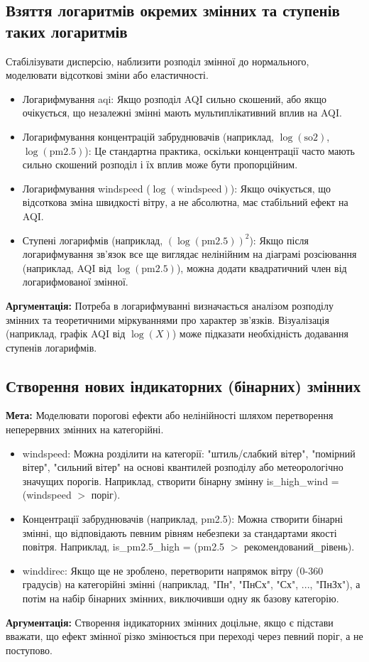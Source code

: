 \documentclass{article}
\begin{document}
\subsection{Взяття логаритмів окремих змінних та ступенів таких логаритмів}
Стабілізувати дисперсію, наблизити розподіл змінної до нормального, моделювати відсоткові зміни або еластичності.
\begin{itemize}
    \item Логарифмування aqi: Якщо розподіл AQI сильно скошений, або якщо очікується, що незалежні змінні мають мультиплікативний вплив на AQI.
    \item Логарифмування концентрацій забруднювачів (наприклад, $\log(\text{so2})$, $\log(\text{pm2.5})$): Це стандартна практика, оскільки концентрації часто мають сильно скошений розподіл і їх вплив може бути пропорційним.
    \item Логарифмування windspeed ($\log(\text{windspeed})$): Якщо очікується, що відсоткова зміна швидкості вітру, а не абсолютна, має стабільний ефект на AQI.
    \item Ступені логарифмів (наприклад, $(\log(\text{pm2.5}))^2$): Якщо після логарифмування зв'язок все ще виглядає нелінійним на діаграмі розсіювання (наприклад, AQI від $\log(\text{pm2.5})$), можна додати квадратичний член від логарифмованої змінної.
\end{itemize}
\textbf{Аргументація:} Потреба в логарифмуванні визначається аналізом розподілу змінних та теоретичними міркуваннями про характер зв'язків. Візуалізація (наприклад, графік AQI від $\log(X)$) може підказати необхідність додавання ступенів логарифмів.


\subsection{Створення нових індикаторних (бінарних) змінних}
\textbf{Мета:} Моделювати порогові ефекти або нелінійності шляхом перетворення неперервних змінних на категорійні.

\begin{itemize}
    \item windspeed: Можна розділити на категорії: "штиль/слабкий вітер", "помірний вітер", "сильний вітер" на основі квантилей розподілу або метеорологічно значущих порогів. Наприклад, створити бінарну змінну is\_high\_wind = (windspeed $>$ поріг).
    \item Концентрації забруднювачів (наприклад, pm2.5): Можна створити бінарні змінні, що відповідають певним рівням небезпеки за стандартами якості повітря. Наприклад, is\_pm2.5\_high = (pm2.5 $>$ рекомендований\_рівень).
    \item winddirec: Якщо ще не зроблено, перетворити напрямок вітру (0-360 градусів) на категорійні змінні (наприклад, "Пн", "ПнСх", "Сх", ..., "ПнЗх"), а потім на набір бінарних змінних, виключивши одну як базову категорію.
\end{itemize}
\textbf{Аргументація:} Створення індикаторних змінних доцільне, якщо є підстави вважати, що ефект змінної різко змінюється при переході через певний поріг, а не поступово.
\end{document}
